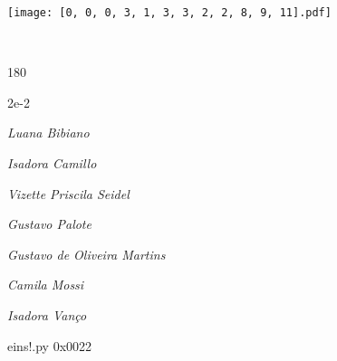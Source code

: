 \documentclass[12pt]{article}
\begin{document}
\texttt{[image: [0, 0, 0, 3, 1, 3, 3, 2, 2, 8, 9, 11].pdf]}


	\hfill	  	  


\pagebreak			

	\ 
	\vfill
	\begin{turn}{180}	
		\begin{minipage}{\textwidth}
		  	\ttfamily %
			\centering
			{\Huge 2e-2}
		  
			\hfill
		  
			

\textit{\small Luana Bibiano}

\textit{\small Isadora Camillo}

\textit{\small Vizette Priscila Seidel}

\textit{\small Gustavo Palote}

\textit{\small Gustavo de Oliveira Martins}

\textit{\small Camila Mossi}

\textit{\small Isadora Vanço}

\bigskip

eins!.py
0x0022


		\end{minipage}	
	\end{turn}
	\vfill
	\

\pagebreak
\end{document}
